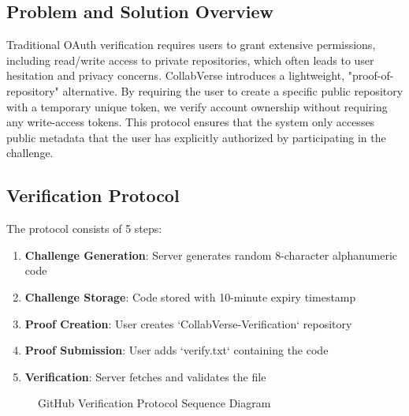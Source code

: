 \documentclass[12pt,a4paper]{article}
\begin{document}
\subsection{Problem and Solution Overview}
Traditional OAuth verification requires users to grant extensive permissions, including read/write access to private repositories, which often leads to user hesitation and privacy concerns. CollabVerse introduces a lightweight, "proof-of-repository" alternative. By requiring the user to create a specific public repository with a temporary unique token, we verify account ownership without requiring any write-access tokens. This protocol ensures that the system only accesses public metadata that the user has explicitly authorized by participating in the challenge.

\subsection{Verification Protocol}
The protocol consists of 5 steps:

\begin{enumerate}
    \item \textbf{Challenge Generation}: Server generates random 8-character alphanumeric code
    \item \textbf{Challenge Storage}: Code stored with 10-minute expiry timestamp
    \item \textbf{Proof Creation}: User creates `CollabVerse-Verification` repository
    \item \textbf{Proof Submission}: User adds `verify.txt` containing the code
    \item \textbf{Verification}: Server fetches and validates the file
\end{enumerate}

\begin{figure}[H]
\centering
{}
\caption{GitHub Verification Protocol Sequence Diagram}
\label{fig:github_protocol}
\end{figure}
\end{document}
